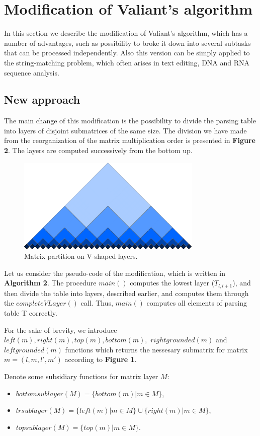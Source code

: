 \documentclass[runningheads]{llncs}
\begin{document}
\section{Modification of Valiant's algorithm}
 
In this section we describe the modification of Valiant's algorithm, which has a number of advantages, such as possibility to broke it down into several subtasks that can be processed independently. Also this version can be simply applied to the string-matching problem, which often arises in text editing, DNA and RNA sequence analysis.

\subsection{New approach}
 
The main change of this modification is the possibility to divide the parsing table into layers of disjoint submatrices of the same size. The division we have made from the reorganization of the matrix multiplication order is presented in \textbf{Figure 2}.  The layers are computed successively from the bottom up.

\begin{figure}[h]
\includegraphics[width=250pt]{layers2.eps}
\centering
\caption{Matrix partition on V-shaped layers.} \label{fig1}
\end{figure}

Let us consider the pseudo-code of the modification, which is written in \textbf{Algorithm 2}. The procedure $main()$ computes the lowest layer ($T_{l, l+1}$), and then divide the table into layers, described earlier, and computes them through the $completeVLayer()$ call. Thus, $main()$ computes all elements of parsing table T correctly.

For the sake of brevity, we introduce $left(m), right(m), top(m), bottom(m),$ $rightgrounded(m)$ and $leftgrounded(m)$ functions which returns the nessesary submatrix for matrix $m = (l, m, l', m')$ according to \textbf{Figure 1}.

Denote some subsidiary functions for matrix layer $M$:
 \begin{itemize}
  \item $bottomsublayer(M) = \{bottom(m) | m \in M \}$,
  \item $lrsublayer(M) = \{left(m) | m \in M \} \cup \{right(m) | m \in M \}$,
  \item $topsublayer(M) = \{top(m) | m \in M \}$.
\end{itemize}
 
\end{document}
